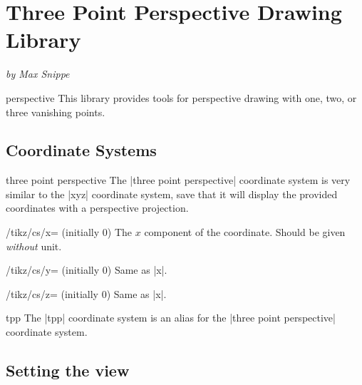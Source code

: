 
\section[library-perspective]{Three Point Perspective Drawing Library}

\noindent\emph{by Max Snippe}

\begin{tikzlibrary}{perspective}
  This library provides tools for perspective drawing with one, two, or three
  vanishing points.
\end{tikzlibrary}


\subsection{Coordinate Systems}

\begin{coordinatesystem}{three point perspective}
  The |three point perspective| coordinate system is very similar to the |xyz|
  coordinate system, save that it will display the provided coordinates with a
  perspective projection.
  \begin{key}{/tikz/cs/x= (initially 0)}
    The $x$ component of the coordinate. Should be given \emph{without} unit.
  \end{key}
  \begin{key}{/tikz/cs/y= (initially 0)}
    Same as |x|.
  \end{key}
  \begin{key}{/tikz/cs/z= (initially 0)}
    Same as |x|.
  \end{key}
\end{coordinatesystem}

\begin{coordinatesystem}{tpp}
  The |tpp| coordinate system is an alias for the |three point perspective|
  coordinate system.
\end{coordinatesystem}


\subsection{Setting the view}

